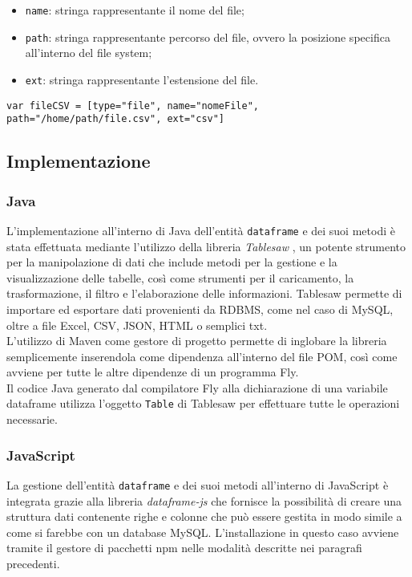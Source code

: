 \begin{itemize}
    \item \verb|name|: stringa rappresentante il nome del file;
    \item \verb|path|: stringa rappresentante percorso del file, ovvero la posizione specifica all'interno del file system; 
    \item \verb|ext|: stringa rappresentante l'estensione del file.
\end{itemize}

\begin{lstlisting}[language=FLY,caption={Dichiarazione di entità file.}, label={lst:file}]
var fileCSV = [type="file", name="nomeFile", path="/home/path/file.csv", ext="csv"]
\end{lstlisting}

\subsection{Implementazione}

\subsubsection{Java}
L'implementazione all'interno di Java dell'entità \verb|dataframe| e dei suoi metodi è stata effettuata mediante l'utilizzo della libreria \textit{Tablesaw} \cite{tablesaw}, un potente strumento per la manipolazione di dati che include metodi per la gestione e la visualizzazione delle tabelle, così come strumenti per il caricamento, la trasformazione, il filtro e l'elaborazione delle informazioni. Tablesaw permette di importare ed esportare dati provenienti da RDBMS, come nel caso di MySQL, oltre a file Excel, CSV, JSON, HTML o semplici txt. \\
L'utilizzo di Maven come gestore di progetto permette di inglobare la libreria semplicemente inserendola come dipendenza all'interno del file POM, così come avviene per tutte le altre dipendenze di un programma Fly. \\
Il codice Java generato dal compilatore Fly alla dichiarazione di una variabile dataframe utilizza l'oggetto \verb|Table| di Tablesaw per effettuare tutte le operazioni necessarie.

\subsubsection{JavaScript}
La gestione dell'entità \verb|dataframe| e dei suoi metodi all'interno di JavaScript è integrata grazie alla libreria \textit{dataframe-js} \cite{dataframejs} che fornisce la possibilità di creare una struttura dati contenente righe e colonne che può essere gestita in modo simile a come si farebbe con un database MySQL. L'installazione in questo caso avviene tramite il gestore di pacchetti npm nelle modalità descritte nei paragrafi precedenti.

